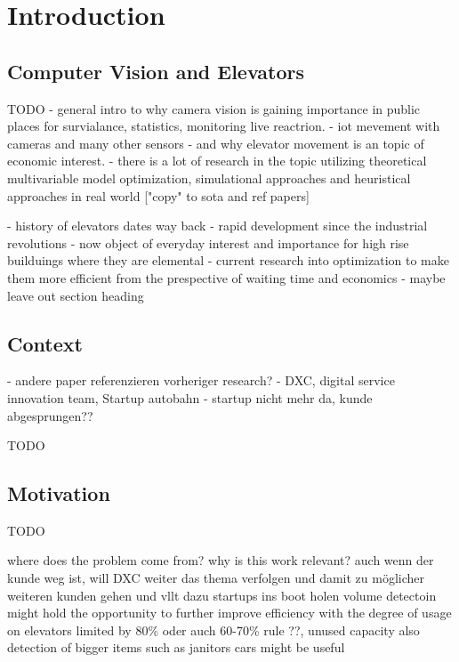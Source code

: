 \chapter{Introduction}
\label{chap:intro}

\section{Computer Vision and Elevators}

TODO
- general intro to why camera vision is gaining importance in public places for survialance, statistics, monitoring live reactrion. 
- iot mevement with cameras and many other sensors
- and why elevator movement is an topic of economic interest.
- there is a lot of research in the topic utilizing theoretical multivariable model optimization, simulational approaches and heuristical approaches in real world ["copy" to sota and ref papers]

- history of elevators dates way back
- rapid development since the industrial revolutions
- now object of everyday interest and importance for high rise builduings where they are elemental
- current research into optimization to make them more efficient from the prespective of waiting time and economics
- maybe leave out section heading





\section{Context}

- andere paper referenzieren vorheriger research?
- DXC, digital service innovation team, Startup autobahn
- startup nicht mehr da, kunde abgesprungen??


TODO

\section{Motivation}


TODO


where does the problem come from?
why is this work relevant?
auch wenn der kunde weg ist, will DXC weiter das thema verfolgen und damit zu möglicher weiteren kunden gehen und vllt dazu startups ins boot holen
volume detectoin might hold the opportunity to further improve efficiency with the degree of usage on elevators
limited by 80\% oder auch 60-70\% rule ??, unused capacity
also detection of bigger items such as janitors cars might be useful


